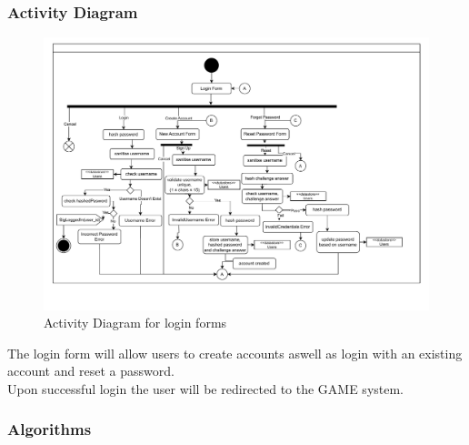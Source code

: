 \documentclass{article}
\begin{document}
        \subsubsection{Activity Diagram}
        \begin{figure}[H]
                \centering
                \includegraphics[width=\textwidth, trim = 0 50 0 0, clip]{images/design/Login_System.pdf}
                \caption{Activity Diagram for login forms}
                \label{fig:ie_2}
        \end{figure}
        The login form will allow users to create accounts aswell as login with an existing account and reset a password.\\
        Upon successful login the user will be redirected to the GAME system.\\
        \subsubsection{Algorithms}
\end{document}
